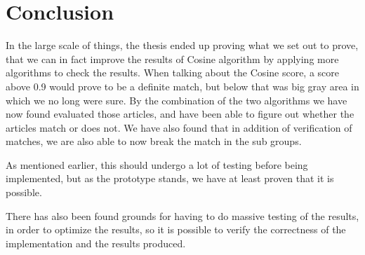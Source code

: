 \chapter{Conclusion}
In the large scale of things, the thesis ended up proving what we set out to prove, that we can in fact improve the results of Cosine algorithm by applying more algorithms to check the results. When talking about the Cosine score, a score above 0.9 would prove to be a definite match, but below that was big gray area in which we no long were sure. By the combination of the two algorithms we have now found evaluated those articles, and have been able to figure out whether the articles match or does not. We have also found that in addition of verification of matches, we are also able to now break the match in the sub groups. 

As mentioned earlier, this should undergo a lot of testing before being implemented, but as the prototype stands, we have at least proven that it is possible.

There has also been found grounds for having to do massive testing of the results, in order to optimize the results, so it is possible to verify the correctness of the implementation and the results produced.